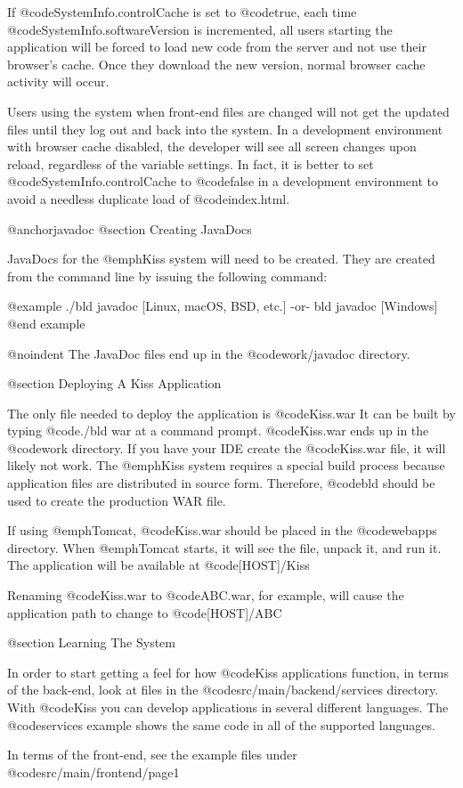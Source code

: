 If @code{SystemInfo.controlCache} is set to @code{true}, each time @code{SystemInfo.softwareVersion}
is incremented, all users starting the application will be forced to
load new code from the server and not use their browser's cache.  Once
they download the new version, normal browser cache activity will
occur.

Users using the system when front-end files are changed will not get
the updated files until they log out and back into the system.  In a
development environment with browser cache disabled, the developer
will see all screen changes upon reload, regardless of the variable settings.
In fact, it is better to set @code{SystemInfo.controlCache} to @code{false}
in a development environment to avoid a needless duplicate load of @code{index.html}.


@anchor{javadoc} @section Creating JavaDocs

JavaDocs for the @emph{Kiss} system will need to be created.  They are
created from the command line by issuing the following command:

@example
./bld javadoc              [Linux, macOS, BSD, etc.]
    -or-
bld javadoc                [Windows]
@end example

@noindent
The JavaDoc files end up in the @code{work/javadoc} directory.


@section Deploying A Kiss Application

The only file needed to deploy the application is @code{Kiss.war} It
can be built by typing @code{./bld war} at a command prompt.
@code{Kiss.war} ends up in the @code{work} directory.  If you
have your IDE create the @code{Kiss.war} file, it will likely not
work.  The @emph{Kiss} system requires a special build process because
application files are distributed in source form.  Therefore, @code{bld}
should be used to create the production WAR file.

If using @emph{Tomcat}, @code{Kiss.war} should be placed in the
@code{webapps} directory.  When @emph{Tomcat} starts, it will see the
file, unpack it, and run it.  The application will be available at
@code{[HOST]/Kiss}

Renaming @code{Kiss.war} to @code{ABC.war}, for example, will cause
the application path to change to @code{[HOST]/ABC}

@section Learning The System

In order to start getting a feel for how @code{Kiss} applications
function, in terms of the back-end, look at files in the
@code{src/main/backend/services} directory.  With @code{Kiss} you can
develop applications in several different languages.  The @code{services}
example shows the same code in all of the supported languages.

In terms of the front-end, see the example files under @code{src/main/frontend/page1}
